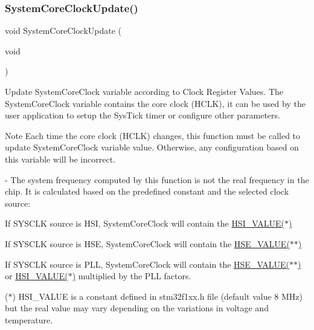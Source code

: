 \subsubsection{\texorpdfstring{System\+Core\+Clock\+Update()}{SystemCoreClockUpdate()}}
{\footnotesize\ttfamily void System\+Core\+Clock\+Update (\begin{DoxyParamCaption}\item[{void}]{ }\end{DoxyParamCaption})}



Update System\+Core\+Clock variable according to Clock Register Values. The System\+Core\+Clock variable contains the core clock (H\+C\+LK), it can be used by the user application to setup the Sys\+Tick timer or configure other parameters. 

\begin{DoxyNote}{Note}
Each time the core clock (H\+C\+LK) changes, this function must be called to update System\+Core\+Clock variable value. Otherwise, any configuration based on this variable will be incorrect.

-\/ The system frequency computed by this function is not the real frequency in the chip. It is calculated based on the predefined constant and the selected clock source\+:
\end{DoxyNote}

\begin{DoxyItemize}
\item If S\+Y\+S\+C\+LK source is H\+SI, System\+Core\+Clock will contain the \hyperlink{group__STM32F1xx__System__Private__Defines_gaaa8c76e274d0f6dd2cefb5d0b17fbc37}{H\+S\+I\+\_\+\+V\+A\+L\+U\+E($\ast$)}
\item If S\+Y\+S\+C\+LK source is H\+SE, System\+Core\+Clock will contain the \hyperlink{group__STM32F1xx__System__Private__Defines_gaeafcff4f57440c60e64812dddd13e7cb}{H\+S\+E\+\_\+\+V\+A\+L\+U\+E($\ast$$\ast$)}
\item If S\+Y\+S\+C\+LK source is P\+LL, System\+Core\+Clock will contain the \hyperlink{group__STM32F1xx__System__Private__Defines_gaeafcff4f57440c60e64812dddd13e7cb}{H\+S\+E\+\_\+\+V\+A\+L\+U\+E($\ast$$\ast$)} or \hyperlink{group__STM32F1xx__System__Private__Defines_gaaa8c76e274d0f6dd2cefb5d0b17fbc37}{H\+S\+I\+\_\+\+V\+A\+L\+U\+E($\ast$)} multiplied by the P\+LL factors.
\end{DoxyItemize}

($\ast$) H\+S\+I\+\_\+\+V\+A\+L\+UE is a constant defined in stm32f1xx.\+h file (default value 8 M\+Hz) but the real value may vary depending on the variations in voltage and temperature.

